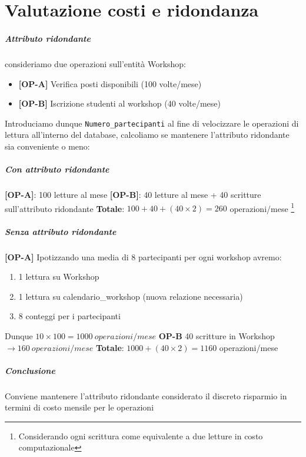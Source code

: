 \chapter{Valutazione costi e ridondanza}
\paragraph{Attributo ridondante} consideriamo due operazioni sull'entità Workshop: 
\begin{itemize}
    \item \textbf{[OP-A]} Verifica posti disponibili (100 volte/mese)
    \item \textbf{[OP-B]} Iscrizione studenti al workshop (40 volte/mese) 
\end{itemize}
Introduciamo dunque \texttt{Numero\_partecipanti} al fine di velocizzare le operazioni di lettura all'interno del database, calcoliamo se mantenere l'attributo ridondante sia conveniente o meno: 
\paragraph{Con attributo ridondante} 
\textbf{[OP-A]}: 100 letture al mese
\newline
\textbf{[OP-B]}: 40 letture al mese + 40 scritture sull'attributo ridondante
\textbf{Totale}: $100 + 40 + (40 \times 2) = 260$ operazioni/mese 
\footnote{Considerando ogni scrittura come equivalente a due letture in costo computazionale}
\paragraph{Senza attributo ridondante} 
\textbf{[OP-A]} Ipotizzando una media di 8 partecipanti per ogni workshop avremo: 
\begin{enumerate}
    \item 1 lettura su Workshop
    \item 1 lettura su calendario\_workshop (nuova relazione necessaria)
    \item 8 conteggi per i partecipanti 
\end{enumerate}
Dunque $10 \times 100 = 1000\ operazioni/mese$ 
\newline
\newline
\textbf{{OP-B}} 40 scritture in Workshop $\longrightarrow 160\ operazioni/mese$
\newline
\textbf{Totale}: $1000 + (40 \times 2) = 1160$ operazioni/mese 
\paragraph{Conclusione} Conviene mantenere l'attributo ridondante considerato il discreto risparmio in termini di costo mensile per le operazioni